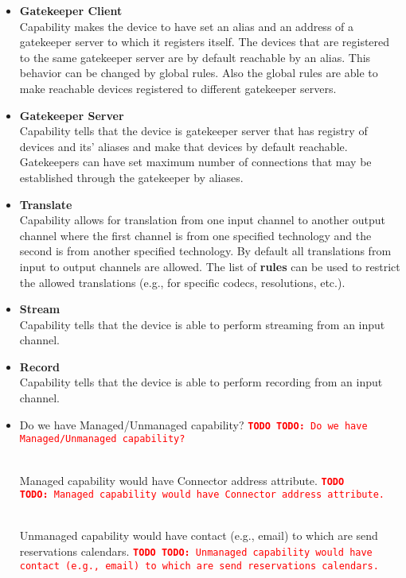 \documentclass[a4paper]{report}
\newcommand{\TODO}[1]{%
\def\empty{}%
\def\prvniparametr{#1}%
\ifx\prvniparametr\empty%
\begingroup\tt\textcolor{red}{\noindent\textbf{TODO}}\endgroup
\else%
\begingroup\tt\textcolor{red}{\noindent\textbf{TODO:}\ #1}\endgroup
\fi%
}
\begin{document}
\begin{itemize}
\item \textbf{Gatekeeper Client} \\
  Capability makes the device to have set an alias 
  and an address of a gatekeeper server to which it registers itself.
  The devices that are registered to the same gatekeeper server are by
  default reachable by an alias. This behavior can be changed by global rules. 
  Also the global rules are able to make reachable devices registered to 
  different gatekeeper servers.

\item \textbf{Gatekeeper Server} \\
  Capability tells that the device is gatekeeper server
  that has registry of devices and its' aliases and make that devices by default 
  reachable. Gatekeepers can have set maximum number of connections that may
  be established through the gatekeeper by aliases.

\item \textbf{Translate}  \\
  Capability allows for translation from one input channel to another output 
  channel where the first channel is from one specified technology and the 
  second is from another specified technology. By default all translations from 
  input to output channels are allowed. The list of \textbf{rules} can be used 
  to restrict the allowed translations (e.g., for specific codecs, resolutions, etc.).

\item \textbf{Stream}  \\
  Capability tells that the device is able to perform streaming from an input 
  channel.

\item \textbf{Record}  \\
  Capability tells that the device is able to perform recording from an input 
  channel.
  
\item \TODO{Do we have Managed/Unmanaged capability?}
 \\ \TODO{Managed capability would have Connector address attribute.}
 \\ \TODO{Unmanaged capability would have contact (e.g., email) to which
 are send reservations calendars.}
\end{itemize}
\end{document}
